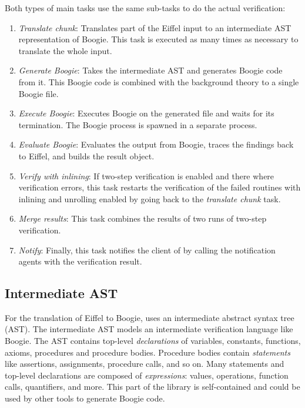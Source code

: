 Both types of main tasks use the same sub-tasks to do the actual verification:
\begin{enumerate}

\item \emph{Translate chunk}: Translates part of the Eiffel input to an intermediate AST representation of Boogie. This task is executed as many times as necessary to translate the whole input.

\item \emph{Generate Boogie}: Takes the intermediate AST and generates Boogie code from it. This Boogie code is combined with the background theory to a single Boogie file.

\item \emph{Execute Boogie}: Executes Boogie on the generated file and waits for its termination. The Boogie process is spawned in a separate process.

\item \emph{Evaluate Boogie}: Evaluates the output from Boogie, traces the findings back to Eiffel, and builds the result object.

\item \emph{Verify with inlining}: If two-step verification is enabled and there where verification errors, this task restarts the verification of the failed routines with inlining and unrolling enabled by going back to the \emph{translate chunk} task.

\item \emph{Merge results}: This task combines the results of two runs of two-step verification.

\item \emph{Notify}: Finally, this task notifies the client of \AutoProof by calling the notification agents with the verification result.

\end{enumerate}


\subsection{Intermediate AST}

For the translation of Eiffel to Boogie, \AutoProof uses an intermediate abstract syntax tree (AST).
The intermediate AST models an intermediate verification language like Boogie. The AST contains top-level \emph{declarations} of variables, constants, functions, axioms, procedures and procedure bodies.
Procedure bodies contain \emph{statements} like assertions, assignments, procedure calls, and so on.
Many statements and top-level declarations are composed of \emph{expressions}: values, operations, function calls, quantifiers, and more.
This part of the \AutoProof library is self-contained and could be used by other tools to generate Boogie code.

